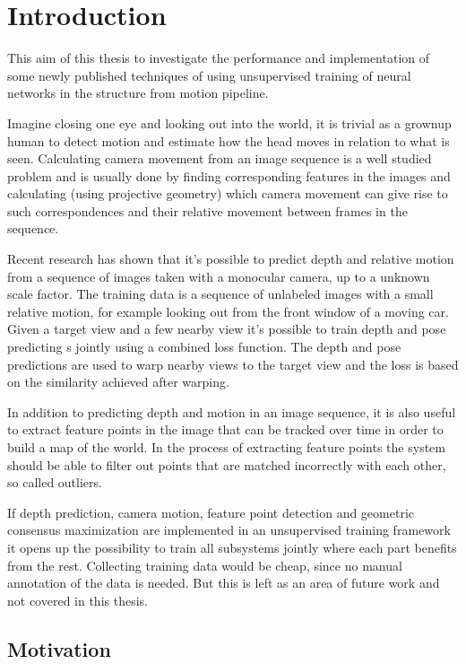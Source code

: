 \chapter{Introduction}\label{cha:introduction}

This aim of this thesis to investigate the performance and implementation of some newly published techniques of using unsupervised training of neural networks in the structure from motion pipeline. 

Imagine closing one eye and looking out into the world, it is trivial as a grownup human to detect motion and estimate how the head moves in relation to what is seen. Calculating camera movement from an image sequence is a well studied problem and is usually done by finding corresponding features in the images and calculating (using projective geometry) which camera movement can give rise to such correspondences and their relative movement between frames in the sequence.

Recent research has shown that it's possible to predict depth and relative motion from a sequence of images taken with a monocular \abbrRGB camera, up to a unknown scale factor. The training data is a sequence of unlabeled images with a small relative motion, for example looking out from the front window of a moving car. Given a target view and a few nearby view it's possible to train depth and pose predicting \abbrCNN{}s jointly using a combined loss function. The depth and pose predictions are used to warp nearby views to the target view and the loss is based on the similarity achieved after warping.

In addition to predicting depth and motion in an image sequence, it is also useful to extract feature points in the image that can be tracked over time in order to build a map of the world. In the process of extracting feature points the system should be able to filter out points that are matched incorrectly with each other, so called outliers.

If depth prediction, camera motion, feature point detection and geometric consensus maximization are implemented in an unsupervised training framework it opens up the possibility to train all subsystems jointly where each part benefits from the rest. Collecting training data would be cheap, since no manual annotation of the data is needed. But this is left as an area of future work and not covered in this thesis.

\section{Motivation}

